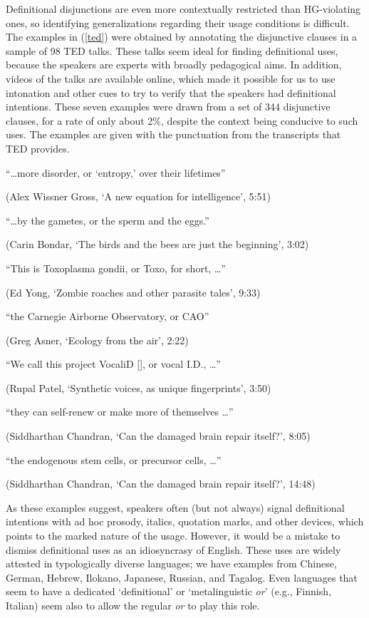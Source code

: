 \documentclass[12pt,twoside]{article}
\newcommand{\eg}[1]{(\ref{#1})}
\newcommand{\word}[1]{\emph{#1}}
\renewcommand{\_}{\textbf{\textunderscore\hspace{-4pt}\textunderscore\hspace{-3pt}\textunderscore\hspace{-4pt}\textunderscore}\hspace{0.5pt}}			%
\begin{document}
Definitional disjunctions are even more contextually restricted than
HG-violating ones, so identifying generalizations regarding their
usage conditions is difficult.  The examples in \eg{ted} were obtained
by annotating the disjunctive clauses in a sample of 98 TED
talks. These talks seem ideal for finding definitional uses, because
the speakers are experts with broadly pedagogical aims. In addition,
videos of the talks are available online, which made it possible for
us to use intonation and other cues to try to verify that the speakers
had definitional intentions. These seven examples were drawn from a
set of 344 disjunctive clauses, for a rate of only about 2\%, despite
the context being conducive to such uses. The examples are given with
the punctuation from the transcripts that TED provides.
%
\begin{exe}
  \ex\label{ted}
  \begin{xlist}
    \ex ``\ldots more disorder, or `entropy,' over their lifetimes''
    
    (Alex Wissner Gross, `A new equation for intelligence', 5:51)

    \ex ``\ldots by the gametes, or the sperm and the eggs.''

    (Carin Bondar, `The birds and the bees are just the beginning', 3:02)

    \ex ``This is Toxoplasma gondii, or Toxo, for short, \ldots''

    (Ed Yong, `Zombie roaches and other parasite tales', 9:33)

    \ex ``the Carnegie Airborne Observatory, or CAO''

    (Greg Asner, `Ecology from the air', 2:22)

    \ex ``We call this project VocaliD [], or vocal I.D., \ldots''

    (Rupal Patel, `Synthetic voices, as unique fingerprints', 3:50)

    \ex ``they can self-renew or make more of themselves \ldots''

    (Siddharthan Chandran, `Can the damaged brain repair itself?', 8:05)

    \ex ``the endogenous stem cells, or precursor cells, \ldots''

    (Siddharthan Chandran, `Can the damaged brain repair itself?', 14:48)
  \end{xlist}
\end{exe}

As these examples suggest, speakers often (but not always) signal
definitional intentions with ad hoc prosody, italics, quotation marks,
and other devices, which points to the marked nature of the
usage. However, it would be a mistake to dismiss definitional uses as
an idiosyncrasy of English. These uses are widely attested in
typologically diverse languages; we have examples from Chinese,
German, Hebrew, Ilokano, Japanese, Russian, and Tagalog. Even
languages that seem to have a dedicated `definitional' or
`metalinguistic \word{or}' (e.g., Finnish, Italian) seem also to allow
the regular \word{or} to play this role.
\end{document}
